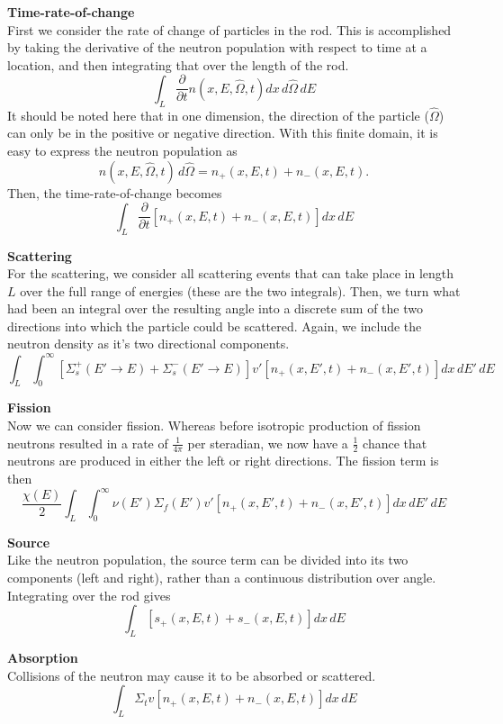 \documentclass{article}
\newcommand{\Oh}{\hat{\Omega}}
\begin{document}
\textbf{Time-rate-of-change}\\
First we consider the rate of change of particles in the rod. This is accomplished by taking the derivative of the neutron population with respect to time at a location, and then integrating that over the length of the rod.
$$ \int_L \frac{\partial}{\partial t}n(x,E,\Oh,t)dx\,d\Oh\,dE $$
It should be noted here that in one dimension, the direction of the particle ($\Oh$) can only be in the positive or negative direction. With this finite domain, it is easy to express the neutron population as
$$ n(x,E,\Oh,t)\,d\Oh = n_{+}(x,E,t) + n_{-}(x,E,t). $$
Then, the time-rate-of-change becomes
$$ \int_L \frac{\partial}{\partial t}\left[n_{+}(x,E,t) + n_{-}(x,E,t)\right]dx\,dE $$

\textbf{Scattering}\\
For the scattering, we consider all scattering events that can take place in length $L$ over the full range of energies (these are the two integrals). Then, we turn what had been an integral over the resulting angle into a discrete sum of the two directions into which the particle could be scattered. Again, we include the neutron density as it's two directional components.
$$ \int_L \int_0^{\infty} \left[\Sigma_s^{+}(E'\rightarrow E) + \Sigma_s^{-}(E'\rightarrow E)\right] v' \left[n_{+}(x,E',t) + n_{-}(x,E',t)\right]dx\,dE'\,dE$$

\textbf{Fission}\\
Now we can consider fission. Whereas before isotropic production of fission neutrons resulted in a rate of $\frac{1}{4\pi}$ per steradian, we now have a $\frac{1}{2}$ chance that neutrons are produced in either the left or right directions. The fission term is then
$$ \frac{\chi(E)}{2} \int_L \int_0^{\infty} \nu(E') \Sigma_f(E') v' \left[n_{+}(x,E',t) + n_{-}(x,E',t)\right]dx\,dE'\,dE $$

\textbf{Source}\\
Like the neutron population, the source term can be divided into its two components (left and right), rather than a continuous distribution over angle. Integrating over the rod gives
$$ \int_L \left[s_{+}(x,E,t) + s_{-}(x,E,t)\right]dx\,dE $$

\textbf{Absorption}\\
Collisions of the neutron may cause it to be absorbed or scattered.
$$ \int_L \Sigma_t v \left[n_{+}(x,E,t) + n_{-}(x,E,t)\right]dx\,dE $$
\end{document}
